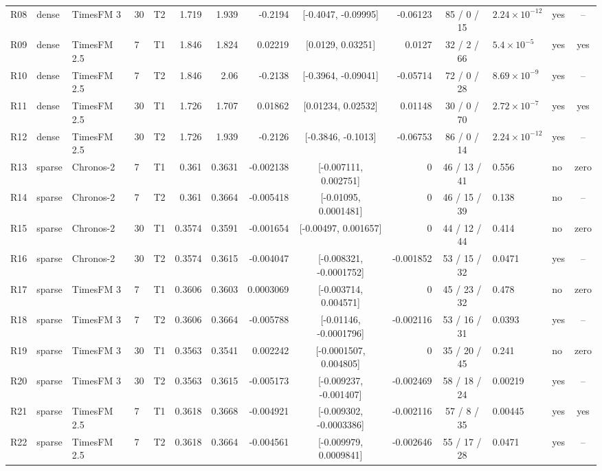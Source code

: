\begin{table}
\begin{tabular}{llllcrrrcrcllc}
R08 & dense & TimesFM 3 & 30 & T2 & 1.719 & 1.939 & -0.2194 & [-0.4047, -0.09995] & -0.06123 & 85 / 0 / 15 & $2.24 \times 10^{-12}$ & yes & -- \\
R09 & dense & TimesFM 2.5 & 7 & T1 & 1.846 & 1.824 & 0.02219 & [0.0129, 0.03251] & 0.0127 & 32 / 2 / 66 & $5.4 \times 10^{-5}$ & yes & yes \\
R10 & dense & TimesFM 2.5 & 7 & T2 & 1.846 & 2.06 & -0.2138 & [-0.3964, -0.09041] & -0.05714 & 72 / 0 / 28 & $8.69 \times 10^{-9}$ & yes & -- \\
R11 & dense & TimesFM 2.5 & 30 & T1 & 1.726 & 1.707 & 0.01862 & [0.01234, 0.02532] & 0.01148 & 30 / 0 / 70 & $2.72 \times 10^{-7}$ & yes & yes \\
R12 & dense & TimesFM 2.5 & 30 & T2 & 1.726 & 1.939 & -0.2126 & [-0.3846, -0.1013] & -0.06753 & 86 / 0 / 14 & $2.24 \times 10^{-12}$ & yes & -- \\
R13 & sparse & Chronos-2 & 7 & T1 & 0.361 & 0.3631 & -0.002138 & [-0.007111, 0.002751] & 0 & 46 / 13 / 41 & 0.556 & no & zero \\
R14 & sparse & Chronos-2 & 7 & T2 & 0.361 & 0.3664 & -0.005418 & [-0.01095, 0.0001481] & 0 & 46 / 15 / 39 & 0.138 & no & -- \\
R15 & sparse & Chronos-2 & 30 & T1 & 0.3574 & 0.3591 & -0.001654 & [-0.00497, 0.001657] & 0 & 44 / 12 / 44 & 0.414 & no & zero \\
R16 & sparse & Chronos-2 & 30 & T2 & 0.3574 & 0.3615 & -0.004047 & [-0.008321, -0.0001752] & -0.001852 & 53 / 15 / 32 & 0.0471 & yes & -- \\
R17 & sparse & TimesFM 3 & 7 & T1 & 0.3606 & 0.3603 & 0.0003069 & [-0.003714, 0.004571] & 0 & 45 / 23 / 32 & 0.478 & no & zero \\
R18 & sparse & TimesFM 3 & 7 & T2 & 0.3606 & 0.3664 & -0.005788 & [-0.01146, -0.0001796] & -0.002116 & 53 / 16 / 31 & 0.0393 & yes & -- \\
R19 & sparse & TimesFM 3 & 30 & T1 & 0.3563 & 0.3541 & 0.002242 & [-0.0001507, 0.004805] & 0 & 35 / 20 / 45 & 0.241 & no & zero \\
R20 & sparse & TimesFM 3 & 30 & T2 & 0.3563 & 0.3615 & -0.005173 & [-0.009237, -0.001407] & -0.002469 & 58 / 18 / 24 & 0.00219 & yes & -- \\
R21 & sparse & TimesFM 2.5 & 7 & T1 & 0.3618 & 0.3668 & -0.004921 & [-0.009302, -0.0003386] & -0.002116 & 57 / 8 / 35 & 0.00445 & yes & yes \\
R22 & sparse & TimesFM 2.5 & 7 & T2 & 0.3618 & 0.3664 & -0.004561 & [-0.009979, 0.0009841] & -0.002646 & 55 / 17 / 28 & 0.0471 & yes & -- \\

\end{tabular}
\end{table}
